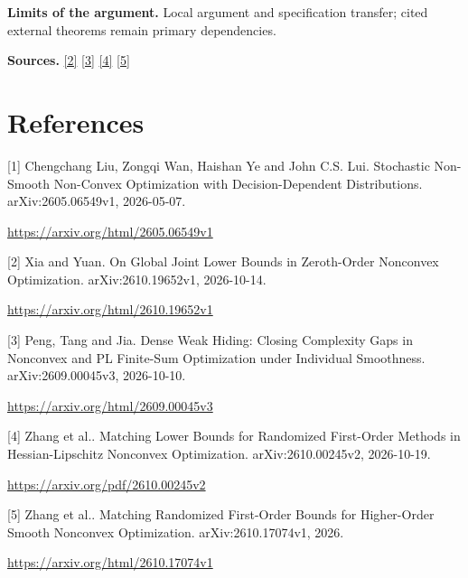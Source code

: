 \documentclass[10pt,a4paper]{article}
\begin{document}
\textbf{Limits of the argument.} Local argument and specification transfer; cited external theorems remain primary dependencies.

\textbf{Sources.} \href{https://arxiv.org/html/2610.19652v1}{[2]} \href{https://arxiv.org/html/2609.00045v3}{[3]} \href{https://arxiv.org/pdf/2610.00245v2}{[4]} \href{https://arxiv.org/html/2610.17074v1}{[5]}

\section{References}
[1] Chengchang Liu, Zongqi Wan, Haishan Ye and John C.S. Lui. Stochastic Non-Smooth Non-Convex Optimization with Decision-Dependent Distributions. arXiv:2605.06549v1, 2026-05-07.

\url{https://arxiv.org/html/2605.06549v1}

[2] Xia and Yuan. On Global Joint Lower Bounds in Zeroth-Order Nonconvex Optimization. arXiv:2610.19652v1, 2026-10-14.

\url{https://arxiv.org/html/2610.19652v1}

[3] Peng, Tang and Jia. Dense Weak Hiding: Closing Complexity Gaps in Nonconvex and PL Finite-Sum Optimization under Individual Smoothness. arXiv:2609.00045v3, 2026-10-10.

\url{https://arxiv.org/html/2609.00045v3}

[4] Zhang et al.. Matching Lower Bounds for Randomized First-Order Methods in Hessian-Lipschitz Nonconvex Optimization. arXiv:2610.00245v2, 2026-10-19.

\url{https://arxiv.org/pdf/2610.00245v2}

[5] Zhang et al.. Matching Randomized First-Order Bounds for Higher-Order Smooth Nonconvex Optimization. arXiv:2610.17074v1, 2026.

\url{https://arxiv.org/html/2610.17074v1}
\end{document}
